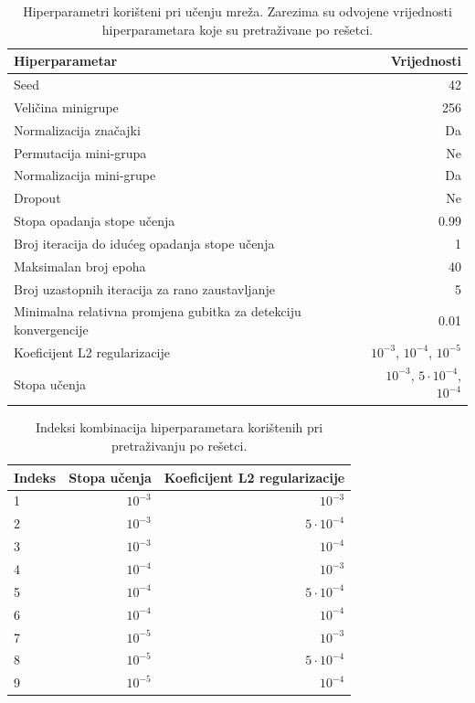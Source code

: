 \documentclass[times, utf8, numeric, diplomski]{fer}
\begin{document}
\begin{table}
\centering
\begin{tabular}{lr}
Hiperparametar & Vrijednosti \\
\hline
Seed & 42 \\
Veličina minigrupe & 256 \\
Normalizacija značajki & Da \\
Permutacija mini-grupa & Ne \\
Normalizacija mini-grupe & Da \\
Dropout & Ne \\
Stopa opadanja stope učenja & 0.99 \\
Broj iteracija do idućeg opadanja stope učenja & 1 \\
Maksimalan broj epoha & 40 \\
Broj uzastopnih iteracija za rano zaustavljanje & 5 \\
Minimalna relativna promjena gubitka za detekciju konvergencije & 0.01 \\
\hline
Koeficijent L2 regularizacije & $10^{-3}$, $10^{-4}$, $10^{-5}$ \\
Stopa učenja & $10^{-3}$, $5 \cdot 10^{-4}$, $10^{-4}$
\end{tabular}
\caption{Hiperparametri korišteni pri učenju mreža. Zarezima su odvojene vrijednosti hiperparametara koje su pretraživane po rešetci.}
\label{tab:hp_256}
\end{table}

\begin{table}
\centering
\begin{tabular}{lrr}
Indeks & Stopa učenja & Koeficijent L2 regularizacije \\
\hline
1 & $10^{-3}$ & $10^{-3}$  \\
2 & $10^{-3}$ & $5 \cdot 10^{-4}$ \\
3 & $10^{-3}$ & $10^{-4}$ \\
4 & $10^{-4}$ & $10^{-3}$ \\
5 & $10^{-4}$ & $5 \cdot 10^{-4}$ \\
6 & $10^{-4}$ & $10^{-4}$ \\
7 & $10^{-5}$ & $10^{-3}$ \\
8 & $10^{-5}$ & $5 \cdot 10^{-4}$ \\
9 & $10^{-5}$ & $10^{-4}$
\end{tabular}
\caption{Indeksi kombinacija hiperparametara korištenih pri pretraživanju po rešetci.}
\label{tab:hp_256_comb}
\end{table}
\end{document}
